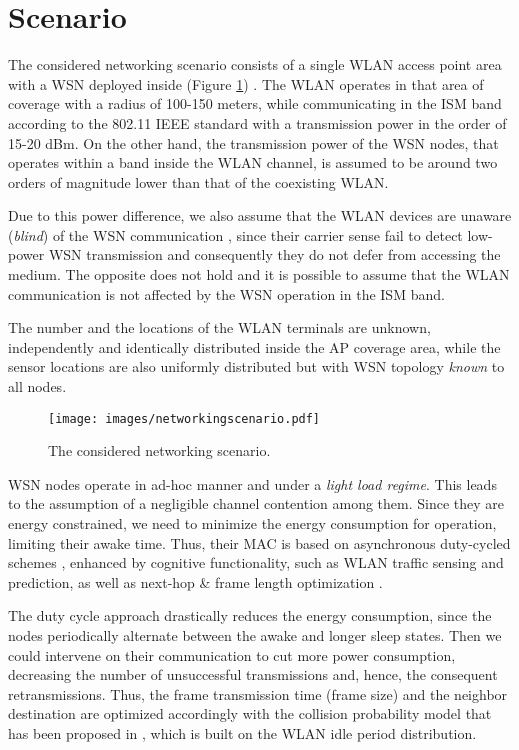 \section{Scenario} \label{sec:scenario}

The considered networking scenario consists of a single \ac{WLAN} access point area with a \ac{WSN} deployed inside (Figure \ref{fig:scenario}) \cite{Scenario}.
The \ac{WLAN} operates in that area of coverage with a radius of 100-150 meters, while communicating in the ISM band according to the 802.11 \acs{IEEE} standard with a transmission power in the order of 15-20 dBm. On the other hand, the transmission power of the \ac{WSN} nodes, that operates within a band inside the \ac{WLAN} channel, is assumed to be around two orders of magnitude lower than that of the coexisting \ac{WLAN}.

Due to this power difference, we also assume that the \ac{WLAN} devices are unaware (\textit{blind}) of the \ac{WSN} communication \cite{ZigBee}, since their carrier sense fail to detect low-power \ac{WSN} transmission and consequently they do not defer from accessing the medium. The opposite does not hold and it is possible to assume that the \ac{WLAN} communication is not affected by the \ac{WSN} operation in the \ac{ISM} band.

The number and the locations of the \ac{WLAN} terminals are unknown, independently and identically distributed inside the \ac{AP} coverage area, while the sensor locations are also uniformly distributed but with \ac{WSN} topology \textit{known} to all nodes.

\begin{figure}[!htbp]
	\begin{center}
		\texttt{[image: images/networkingscenario.pdf]}
	\end{center}
	\caption{The considered networking scenario.}
	\label{fig:scenario}
\end{figure}

\ac{WSN} nodes operate in ad-hoc manner and under a \textit{light load regime}. This leads to the assumption of a negligible channel contention among them. Since they are energy constrained, we need to minimize the energy consumption for operation, limiting their awake time. Thus, their \ac{MAC} is based on asynchronous duty-cycled schemes \cite{X-MAC}, enhanced by cognitive functionality, such as \ac{WLAN} traffic sensing and prediction, as well as next-hop \& frame length optimization \cite{Scenario}.

The duty cycle approach drastically reduces the energy consumption, since the nodes periodically alternate between the awake and longer sleep states. Then we could intervene on their communication to cut more power consumption, decreasing the number of unsuccessful transmissions and, hence, the consequent retransmissions. Thus, the frame transmission time (frame size) and the neighbor destination are optimized accordingly with the collision probability model that has been proposed in \cite{Scenario}, which is built on the \ac{WLAN} idle period distribution.


